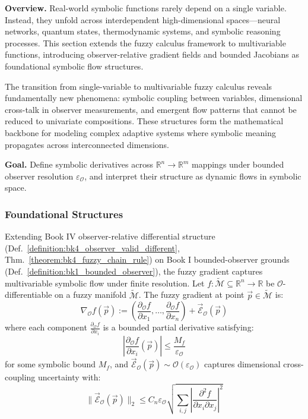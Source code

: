 \textbf{Overview.} Real-world symbolic functions rarely depend on a single variable. Instead, they unfold across interdependent high-dimensional spaces---neural networks, quantum states, thermodynamic systems, and symbolic reasoning processes. This section extends the fuzzy calculus framework to multivariable functions, introducing observer-relative gradient fields and bounded Jacobians as foundational symbolic flow structures.

The transition from single-variable to multivariable fuzzy calculus reveals fundamentally new phenomena: symbolic coupling between variables, dimensional cross-talk in observer measurements, and emergent flow patterns that cannot be reduced to univariate compositions. These structures form the mathematical backbone for modeling complex adaptive systems where symbolic meaning propagates across interconnected dimensions.

\textbf{Goal.} Define symbolic derivatives across $\mathbb{R}^n \to \mathbb{R}^m$ mappings under bounded observer resolution $\varepsilon_{\mathcal{O}}$, and interpret their structure as dynamic flows in symbolic space.

\subsubsection{Foundational Structures}

\begin{definition}
\label{definition:bk4_fuzzy_gradient}
Extending Book IV observer-relative differential structure (Def.~\ref{definition:bk4_observer_valid_different}, Thm.~\ref{theorem:bk4_fuzzy_chain_rule}) on Book I bounded-observer grounds (Def.~\ref{definition:bk1_bounded_observer}), the fuzzy gradient captures multivariable symbolic flow under finite resolution.
Let $f : \tilde{\mathcal{M}} \subseteq \mathbb{R}^n \to \mathbb{R}$ be $\mathcal{O}$-differentiable on a fuzzy manifold $\tilde{\mathcal{M}}$. The fuzzy gradient at point $\vec{p} \in \tilde{\mathcal{M}}$ is:
\[
\nabla_{\mathcal{O}} f(\vec{p}) := 
\left(
\frac{\partial_{\mathcal{O}} f}{\partial x_1}, 
\dots, 
\frac{\partial_{\mathcal{O}} f}{\partial x_n}
\right)
+ \vec{\mathcal{E}}_{\mathcal{O}}(\vec{p})
\]
where each component $\frac{\partial_{\mathcal{O}} f}{\partial x_i}$ is a bounded partial derivative satisfying:
\[
\left|\frac{\partial_{\mathcal{O}} f}{\partial x_i}(\vec{p})\right| \leq \frac{M_f}{\varepsilon_{\mathcal{O}}}
\]
for some symbolic bound $M_f$, and $\vec{\mathcal{E}}_{\mathcal{O}}(\vec{p}) \sim \mathcal{O}(\varepsilon_{\mathcal{O}})$ captures dimensional cross-coupling uncertainty with:
\[
\|\vec{\mathcal{E}}_{\mathcal{O}}(\vec{p})\|_2 \leq C_n \varepsilon_{\mathcal{O}} \sqrt{\sum_{i,j} \left|\frac{\partial^2 f}{\partial x_i \partial x_j}\right|^2}
\]
\end{definition}

